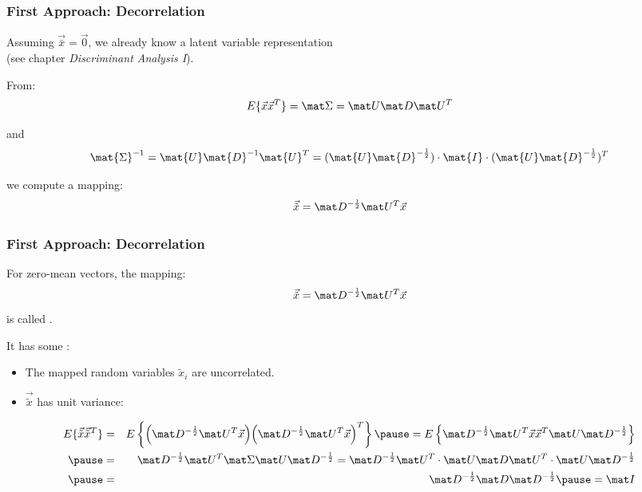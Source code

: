 \begin{frame}
  \frametitle{First Approach: Decorrelation}

  Assuming $\vec{\bar{x}} = \vec{0}$, we already know a latent variable representation \\
  (see chapter \emph{Discriminant Analysis I}). \\[.5cm] \pause 

  From:
  \begin{displaymath}
      E\{ \vec x \vec x^T \} = \mat \Sigma = \mat U \mat D \mat U^T
  \end{displaymath}
  \pause 

  and
  \begin{displaymath}
    \mat{\Sigma}^{-1} 
    = \mat{U}\mat{D}^{-1}\mat{U}^T
    = (\mat{U}\mat{D}^{-\frac{1}{2}})\cdot \mat{I} \cdot(\mat{U}\mat{D}^{-\frac{1}{2}})^T
  \end{displaymath}
  \pause 

  we compute a mapping:
  \begin{displaymath}
    \vec{\tilde{x}} = \mat D^{-\frac{1}{2}} \mat U^T \vec x
  \end{displaymath}
\end{frame}


\begin{frame}
  \frametitle{First Approach: Decorrelation}

  For zero-mean vectors, the mapping:
  \begin{displaymath}
    \vec{\tilde{x}} = \mat D^{-\frac{1}{2}} \mat U^T \vec x
  \end{displaymath}
  is called . \\[0.3cm] \pause

  It has some :

  \begin{itemize}
    \item The mapped random variables $\tilde{x}_i$ are uncorrelated. \pause
    \item $\vec{\tilde{x}}$ has unit variance:
  \end{itemize}

  \begin{eqnarray*}
     E\{ \vec{\tilde{x}} \vec{\tilde{x}}^T \} 
     &=& E\left\{ \Big( \mat D^{-\frac{1}{2}} \mat U^T \vec x \Big) \Big( \mat D^{-\frac{1}{2}} \mat U^T \vec x \Big)^T \right\} \pause 
     = E\left\{ \mat D^{-\frac{1}{2}} \mat U^T \vec x \vec x^T \mat U \mat D^{-\frac{1}{2}} \right\} \\ \pause 
     &=& \mat D^{-\frac{1}{2}} \mat U^T \mat \Sigma \mat U \mat D^{-\frac{1}{2}} = \mat D^{-\frac{1}{2}} \mat U^T \cdot \mat U \mat D \mat U^T \cdot \mat U \mat D^{-\frac{1}{2}} \\ \pause 
     &=& \mat D^{-\frac{1}{2}} \mat D \mat D^{-\frac{1}{2}} \pause 
     = \mat I
  \end{eqnarray*}
\end{frame}


